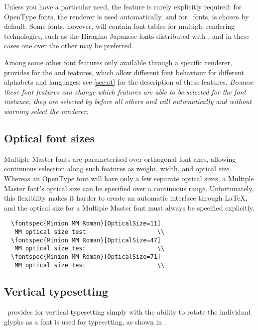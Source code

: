 \documentclass[a4paper]{l3doc}
\begin{document}
Unless you have a particular need, the  feature is rarely explicitly required: for OpenType
fonts, the  renderer is used automatically, and for \AAT\ fonts,
 is chosen by default. Some fonts, however, will contain font tables
for multiple rendering technologies, such as the Hiragino Japanese fonts
distributed with \MacOSX, and in these cases one over the other may be preferred.

Among some other font features only available through a specific renderer,
 provides for the  and  features, which allow
different font behaviour for different alphabets and languages; see \vref{sec:ot}
for the description of these features. {\em Because these font features can
change which features are able to be selected for the font instance, they are selected
by  before all others and will automatically and without warning
select the  renderer.}


\subsection{Optical font sizes} \label{sec:aat-opticalsize}

Multiple Master fonts are parameterised over
orthogonal font axes, allowing continuous selection along such
features as weight, width, and optical size.
Whereas an OpenType font will have only a few separate
optical sizes, a Multiple Master font's optical size can be
specified over a continuous range. Unfortunately, this flexibility makes
it harder to create an automatic interface through \LaTeX, and the
optical size for a Multiple Master font must always be specified
explicitly.
\begin{Verbatim}
  \fontspec{Minion MM Roman}[OpticalSize=11]
   MM optical size test                    \\
  \fontspec{Minion MM Roman}[OpticalSize=47]
   MM optical size test                    \\
  \fontspec{Minion MM Roman}[OpticalSize=71]
   MM optical size test                    \\
\end{Verbatim}


\subsection{Vertical typesetting}

\XeTeX\ provides for vertical typesetting simply with the ability to rotate
the individual glyphs as a font is used for typesetting, as shown in
.
\end{document}
